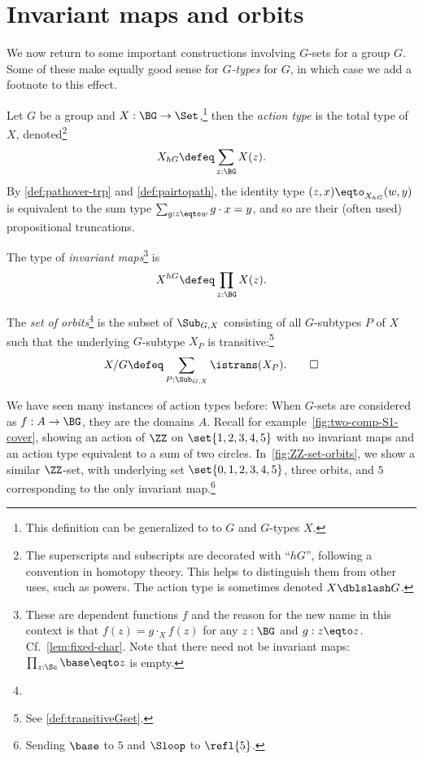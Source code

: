\section{Invariant maps and orbits}
\label{sec:fixpts-orbits}
We now return to some important constructions involving $G$-sets for a group $G$.
Some of these make equally good sense for \emph{$G$-types} for \aninftygp
$G$, in which case we add a footnote to this effect.
\begin{definition}
  \label{def:actiontype} Let $G$ be a group and $X : \BG\to\Set$,\footnote{%
  This definition can be generalized to to \inftygps $G$ and $G$-types $X$.}
  then the \emph{action type}
  is the total type of $X$, denoted\footnote{%
    The superscripts and subscripts are decorated with ``$hG$'',
    following a convention in homotopy theory.
    This helps to distinguish them from other uses, such as powers.
    The action type is sometimes denoted $X \dblslash G$.}
\[
  X_{hG} \defeq \sum_{z:\BG} X(z).
\]
By \cref{def:pathover-trp} and \cref{def:pairtopath}, 
the identity type $(z,x)\eqto_{X_{hG}}(w,y)$
is equivalent to the sum type $\sum_{g:z\eqto w} g\cdot x = y$,
and so are their (often used) propositional truncations.

The type of \emph{invariant maps}\footnote{%
These are dependent functions $f$ and the reason for the new name
in this context is that $f(z) = g \cdot_X f(z)$ for any $z:\BG$
and $g:z\eqto z$. Cf.~\cref{lem:fixed-char}. Note that there need not be invariant maps: $\prod_{z:\Sc}\base\eqto z$ is empty.}
 is
\[
  X^{hG} \defeq \prod_{z:\BG} X(z).
\]

The \emph{set of orbits}\footnote{}
 is the subset of $\Sub_{G,X}$ consisting
of all $G$-subtypes $P$ of $X$ such that the underlying $G$-subtype $X_P$
is transitive:\footnote{See \cref{def:transitiveGset}.}
\[
  X / G \defeq \sum_{P:\Sub_{G,X}}\istrans(X_P).\qedhere
\]
\end{definition}

We have seen many instances of action types before:
When $G$-sets are considered as \coverings $f : A \to \BG$,
they are the domains $A$.
Recall for example~\cref{fig:two-comp-S1-cover},
showing an action of $\ZZ$ on $\set{1,2,3,4,5}$ with no invariant maps
and an action type equivalent to a sum of two circles.
In~\cref{fig:ZZ-set-orbits}, we show a similar $\ZZ$-set,
with underlying set $\set{0,1,2,3,4,5}$, three orbits,
and $5$ corresponding to the only invariant map.\footnote{%
Sending $\base$ to $5$ and $\Sloop$ to $\refl{5}$.}


